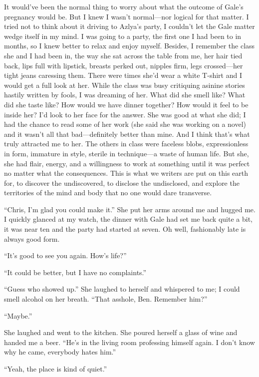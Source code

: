It would've been the normal thing to worry about what the outcome of
Gale's pregnancy would be. But I knew I wasn't normal---nor logical for
that matter. I tried not to think about it driving to Azlya's party, I
couldn't let the Gale matter wedge itself in my mind. I was going to a
party, the first one I had been to in months, so I knew better to relax
and enjoy myself. Besides, I remember the class she and I had been in,
the way she sat across the table from me, her hair tied back, lips full
with lipstick, breasts perked out, nipples firm, legs crossed---her
tight jeans caressing them. There were times she'd wear a white T-shirt
and I would get a full look at her. While the class was busy critiquing
asinine stories hastily written by fools, I was dreaming of her. What
did she smell like? What did she taste like? How would we have dinner
together? How would it feel to be inside her? I'd look to her face for
the answer. She was good at what she did; I had the chance to read some
of her work (she said she was working on a novel) and it wasn't all that
bad---definitely better than mine. And I think that's what truly
attracted me to her. The others in class were faceless blobs,
expressionless in form, immature in style, sterile in technique---a
waste of human life. But she, she had flair, energy, and a willingness
to work at something until it was perfect no matter what the
consequences. This is what we writers are put on this earth for, to
discover the undiscovered, to disclose the undisclosed, and explore the
territories of the mind and body that no one would dare transverse.

``Chris, I'm glad you could make it.'' She put her arms around me and
hugged me. I quickly glanced at my watch, the dinner with Gale had set
me back quite a bit, it was near ten and the party had started at seven.
Oh well, fashionably late is always good form.

``It's good to see you again. How's life?''

``It could be better, but I have no complaints.''

``Guess who showed up.'' She laughed to herself and whispered to me; I
could smell alcohol on her breath. ``That asshole, Ben. Remember him?''

``Maybe.''

She laughed and went to the kitchen. She poured herself a glass of wine
and handed me a beer. ``He's in the living room professing himself
again. I don't know why he came, everybody hates him.''

``Yeah, the place is kind of quiet.''

